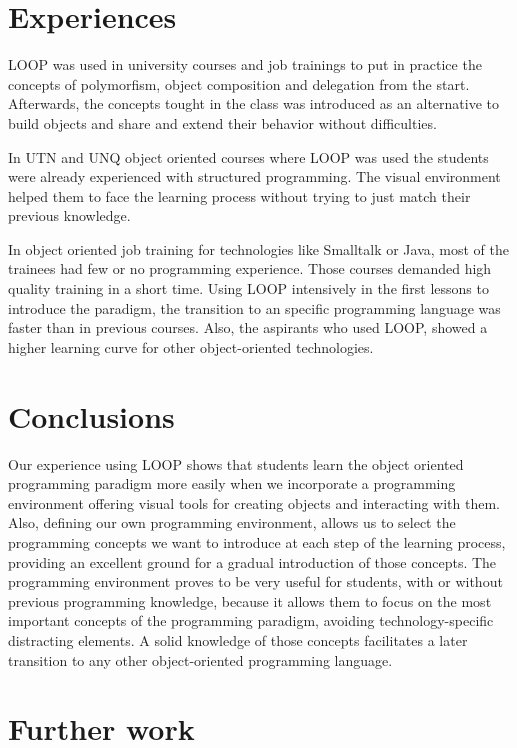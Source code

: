 \documentclass{sigplanconf}
\begin{document}
\section{Experiences}

LOOP was used in university courses and job trainings to put in practice the concepts of polymorfism, object composition and delegation from the start.  Afterwards, the concepts tought in the class was introduced as an alternative to build objects and share and extend their behavior without difficulties.

\bigskip
In UTN and UNQ object oriented courses where LOOP was used the students were already experienced with structured programming.  The visual environment helped them to face the learning process without trying to just match their previous knowledge.

In object oriented job training for technologies like Smalltalk or Java, most of the trainees had few or no programming experience. Those courses demanded high quality training in a short time. Using LOOP intensively in the first lessons to introduce the paradigm, the transition to an specific programming language was faster than in previous courses. Also, the aspirants who used LOOP, showed a higher learning curve for other object-oriented technologies.

\section{Conclusions}

Our experience using LOOP shows that students learn the object oriented programming paradigm more easily when we incorporate a programming environment offering visual tools for creating objects and interacting with them. Also, defining our own programming environment, allows us to select the programming concepts we want to introduce at each step of the learning process, providing an excellent ground for a gradual introduction of those concepts. The programming environment proves to be very useful for students, with or without previous programming knowledge, because it allows them to focus on the most important concepts of the programming paradigm, avoiding technology-specific distracting elements. A solid knowledge of those concepts facilitates a later transition to any other object-oriented programming language.

\section{Further work}
\end{document}

